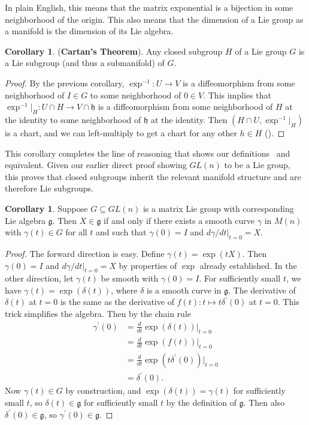 \documentclass[12pt]{article}
\newcommand{\g}{\mathfrak{g}}
\theoremstyle{definition}
\theoremstyle{definition}
\newtheorem{cor}[them]{Corollary}
\theoremstyle{definition}
\theoremstyle{definition}
\theoremstyle{definition}
\theoremstyle{definition}
\theoremstyle{definition}
\theoremstyle{definition}
\begin{document}
\par{In plain English, this means that the matrix exponential is a bijection in some neighborhood of the origin. This also means that the dimension of a Lie group as a manifold is the dimension of its Lie algebra.}

\begin{cor}\label{cor:csg} 
(\textbf{Cartan’s Theorem}).
Any closed subgroup $H$ of a Lie
group $G$ is a Lie subgroup (and thus a submanifold) of $G$.
\end{cor}
\begin{proof}
By the previous corollary, $\exp^{-1}: U \to
V$ is a diffeomorphism from some neighborhood
of $I \in G$ to some neighborhood of $0 \in
V$. This implies that $\exp^{-1}\big|_H: U
\cap H \to V \cap \mathfrak{h}$ is a
diffeomorphism from some neighborhood of $H$
at the identity to some neighborhood of
$\mathfrak{h}$ at the identity. Then
$(H \cap U, \exp^{-1}\big|_H)$ is a chart, and
we can left-multiply to get a chart for
any other $h \in H$ (\cite{Wang}). 
\end{proof}

\par{This corollary completes the line of
reasoning that shows our
definitions~ and~
equivalent. Given our earlier direct proof showing
$GL(n)$ to be a Lie group, this proves that closed
subgroups inherit the relevant manifold structure
and are therefore Lie subgroups.}

\begin{cor}\label{cor:tsi}
Suppose $G \subseteq
GL(n)$ is a matrix Lie group with
corresponding Lie algebra $\g$. Then $X \in
\g$ if and only if there exists a smooth curve
$\gamma$ in $M(n)$ with $\gamma(t) \in G$ for all
$t$ and such that $\gamma(0) = I$ and
$d\gamma/dt|_{t=0} = X$.
\end{cor}
\begin{proof}
The forward direction is easy. Define
$\gamma(t) = \exp(tX)$. Then $\gamma(0) = I$ and
$d\gamma/dt|_{t=0}=X$ by properties of $\exp$
already established. In the other direction, let
$\gamma(t)$ be smooth with $\gamma(0) = I$. For
sufficiently small $t$, we have $\gamma(t) =
\exp(\delta(t))$, where $\delta$ is a smooth curve
in $\g$. The derivative of $\delta(t)$ at $t = 0$
is the same as the derivative of $f(t): t \mapsto
t \delta^{\prime}(0)$ at $t = 0$. This trick
simplifies the algebra. Then by the chain rule
\[
\begin{aligned}
    \gamma^\prime(0) & = \frac{d}{dt}\exp(\delta(t))\Big|_{t=0} \\
    & = \frac{d}{dt}\exp(f(t))\Big|_{t=0} \\
    & = \frac{d}{dt}\exp(t\delta^\prime(0))\Big|_{t=0} \\
    & = \delta^\prime(0).
\end{aligned}
\] 
Now $\gamma(t) \in G$ by construction, and $\exp(\delta(t)) = \gamma(t)$ for sufficiently small $t$, so $\delta(t) \in \g$ for sufficiently small $t$ by the definition of $\g$. Then also $\delta^\prime(0) \in \g$, so $\gamma^\prime(0) \in \g$.
\end{proof}
\end{document}
